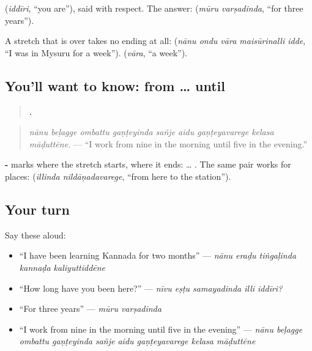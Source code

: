 \textbf{} (\emph{iddīri}, \textquotedblleft{}you are\textquotedblright{}), said with respect. The answer: \textbf{ } (\emph{mūru varṣadinda}, \textquotedblleft{}for three years\textquotedblright{}).

A stretch that is over takes no ending at all: \textbf{    } (\emph{nānu ondu vāra maisūrinalli idde}, \textquotedblleft{}I was in Mysuru for a week\textquotedblright{}). \textbf{} (\emph{vāra}, \textquotedblleft{}a week\textquotedblright{}).

\subsection*{You'll want to know: from … until}
\begin{quote}
\textbf{        .}
\end{quote}

\begin{quote}
\emph{nānu beḷagge ombattu gaṇṭeyinda sañje aidu gaṇṭeyavarege kelasa māḍuttēne.} — \textquotedblleft{}I work from nine in the morning until five in the evening.\textquotedblright{}
\end{quote}

\textbf{-} marks where the stretch starts, \textbf{} where it ends: \textbf{} … \textbf{}. The same pair works for places: \textbf{ } (\emph{illinda nildāṇadavarege}, \textquotedblleft{}from here to the station\textquotedblright{}).

\subsection*{Your turn}
Say these aloud:

\begin{itemize}
\raggedright
  \item \textquotedblleft{}I have been learning Kannada for two months\textquotedblright{} — \emph{nānu eraḍu tiṅgaḷinda kannaḍa kaliyuttiddēne}
  \item \textquotedblleft{}How long have you been here?\textquotedblright{} — \emph{nīvu eṣṭu samayadinda illi iddīri?}
  \item \textquotedblleft{}For three years\textquotedblright{} — \emph{mūru varṣadinda}
  \item \textquotedblleft{}I work from nine in the morning until five in the evening\textquotedblright{} — \emph{nānu beḷagge ombattu gaṇṭeyinda sañje aidu gaṇṭeyavarege kelasa māḍuttēne}
\end{itemize}

